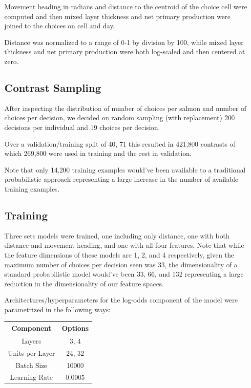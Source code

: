 \documentclass[11pt]{article}
\begin{document}
Movement heading in radians and distance to the centroid of the choice cell were computed and then mixed layer thickness and net primary production were joined to the choices on cell and day.

Distance was normalized to a range of 0-1 by division by 100, while mixed layer thickness and net primary production were both log-scaled and then centered at zero. 

\subsection*{Contrast Sampling}

After inspecting the distribution of number of choices per salmon and number of choices per decision, we decided on random sampling (with replacement) 200 decisions per individual and 19 choices per decision. 

Over a validation/training split of 40, 71 this resulted in 421,800 contrasts of which 269,800 were used in training and the rest in validation. 

Note that only 14,200 training examples would've been available to a traditional probabilistic approach representing a large increase in the number of available training examples.   

\subsection*{Training}

Three sets models were trained, one including only distance, one with both distance and movement heading, and one with all four features. Note that while the feature dimensions of these models are 1, 2, and 4 respectively, given the maximum number of choices per decision seen was 33, the dimensionality of a standard probabilistic model would've been 33, 66, and 132 representing a large reduction in the dimensionality of our feature spaces. 

Architectures/hyperparameters for the log-odds component of the model were parametrized in the following ways:

\begin{center}
\begin{tabular}{| c | c |} 
\hline 
Component & Options \\
\hline
Layers & 3, 4 \\ 
Units per Layer & 24, 32 \\
Batch Size & 10000 \\
Learning Rate & 0.0005 \\
\hline
\end{tabular}
\end{center}
\end{document}
